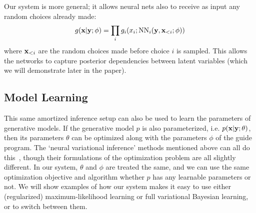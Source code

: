 Our system is more general; it allows neural nets also to receive as input any random choices already made:
\begin{equation*}
g(\mathbf{x} | \mathbf{y} ; \phi) = \prod_i g_i(x_i ; \text{NN}_i(\mathbf{y}, \mathbf{x}_{<i} ; \phi))
\end{equation*}
where $\mathbf{x}_{<i}$ are the random choices made before choice $i$ is sampled. This allows the networks to capture posterior dependencies between latent variables (which we will demonstrate later in the paper).

\subsection{Model Learning}

This same amortized inference setup can also be used to learn the parameters of generative models. If the generative model $p$ is also parameterized, i.e. $p(\mathbf{x} | \mathbf{y} ; \theta)$, then its parameters $\theta$ can be optimized along with the parameters $\phi$ of the guide program.
The `neural variational inference' methods mentioned above can all do this~\cite{NVIL,DLGM,AEVB}, though their formulations of the optimization problem are all slightly different.
In our system, $\theta$ and $\phi$ are treated the same, and we can use the same optimization objective and algorithm whether $p$ has any learnable parameters or not.
We will show examples of how our system makes it easy to use either (regularized) maximum-likelihood learning or full variational Bayesian learning, or to switch between them.

